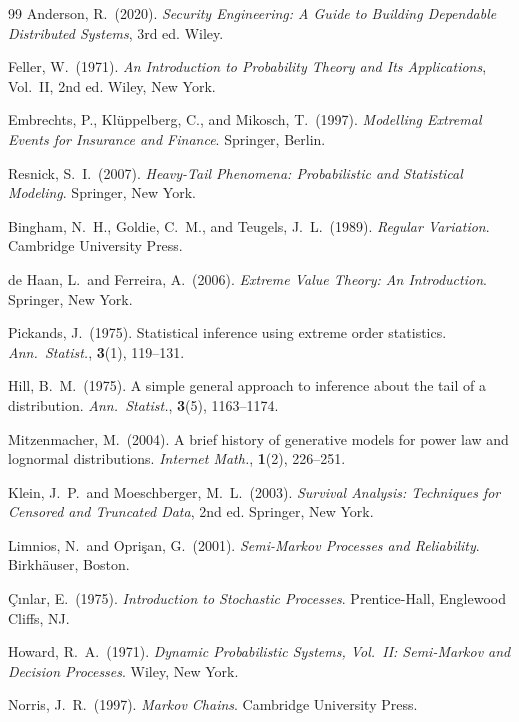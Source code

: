 \documentclass[12pt,a4paper]{article}
\theoremstyle{plain}
\theoremstyle{definition}
\theoremstyle{remark}
\begin{document}
\begin{thebibliography}{99}
Anderson, R.\ (2020).
\textit{Security Engineering: A Guide to Building Dependable Distributed Systems},
3rd ed.
Wiley.

Feller, W.\ (1971).
\textit{An Introduction to Probability Theory and Its Applications},
Vol.~II, 2nd ed.
Wiley, New York.

Embrechts, P., Kl{\"u}ppelberg, C., and Mikosch, T.\ (1997).
\textit{Modelling Extremal Events for Insurance and Finance}.
Springer, Berlin.

Resnick, S.\ I.\ (2007).
\textit{Heavy-Tail Phenomena: Probabilistic and Statistical Modeling}.
Springer, New York.

Bingham, N.\ H., Goldie, C.\ M., and Teugels, J.\ L.\ (1989).
\textit{Regular Variation}.
Cambridge University Press.

de Haan, L.\ and Ferreira, A.\ (2006).
\textit{Extreme Value Theory: An Introduction}.
Springer, New York.

Pickands, J.\ (1975).
Statistical inference using extreme order statistics.
\textit{Ann.\ Statist.}, \textbf{3}(1), 119--131.

Hill, B.\ M.\ (1975).
A simple general approach to inference about the tail of a distribution.
\textit{Ann.\ Statist.}, \textbf{3}(5), 1163--1174.

Mitzenmacher, M.\ (2004).
A brief history of generative models for power law and lognormal distributions.
\textit{Internet Math.}, \textbf{1}(2), 226--251.

Klein, J.\ P.\ and Moeschberger, M.\ L.\ (2003).
\textit{Survival Analysis: Techniques for Censored and Truncated Data},
2nd ed.
Springer, New York.

Limnios, N.\ and Opri\c{s}an, G.\ (2001).
\textit{Semi-Markov Processes and Reliability}.
Birkh{\"a}user, Boston.

{\c C}{\i}nlar, E.\ (1975).
\textit{Introduction to Stochastic Processes}.
Prentice-Hall, Englewood Cliffs, NJ.

Howard, R.\ A.\ (1971).
\textit{Dynamic Probabilistic Systems, Vol.~II: Semi-Markov and Decision Processes}.
Wiley, New York.

Norris, J.\ R.\ (1997).
\textit{Markov Chains}.
Cambridge University Press.


\end{thebibliography}
\end{document}
